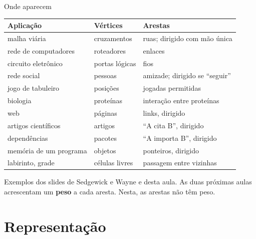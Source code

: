 \documentclass{beamer}
\begin{document}
\begin{frame}{Onde aparecem}
	\footnotesize
	\begin{tabular}{lll}
		\toprule
		Aplicação & Vértices & Arestas \\
		\midrule
		malha viária & cruzamentos & ruas; dirigido com mão única \\
		rede de computadores & roteadores & enlaces \\
		circuito eletrônico & portas lógicas & fios \\
		rede social & pessoas & amizade; dirigido se ``seguir'' \\
		jogo de tabuleiro & posições & jogadas permitidas \\
		biologia & proteínas & interação entre proteínas \\
		web & páginas & links, dirigido \\
		artigos científicos & artigos & ``A cita B'', dirigido \\
		dependências & pacotes & ``A importa B'', dirigido \\
		memória de um programa & objetos & ponteiros, dirigido \\
		labirinto, grade & células livres & passagem entre vizinhas \\
		\bottomrule
	\end{tabular}

	\vspace{0.3cm}
	\small
	Exemplos dos slides de Sedgewick e Wayne e desta aula. As duas próximas
	aulas acrescentam um \textbf{peso} a cada aresta. Nesta, as arestas não têm
	peso.
\end{frame}

\section{Representação}
\end{document}
